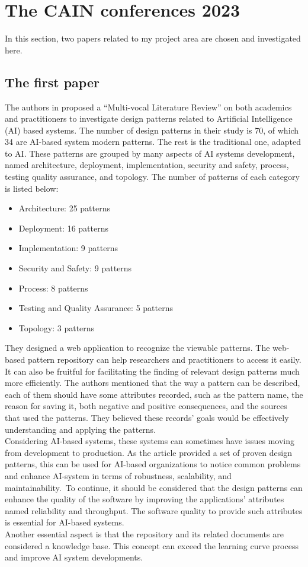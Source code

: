 \documentclass{article}
\begin{document}
\section{The CAIN conferences 2023}
In this section, two papers related to my project area are chosen and investigated here. 
\subsection{The first paper}
The authors in \cite{heiland2023design} proposed a ``Multi-vocal Literature Review'' on both academics and practitioners to investigate design patterns related to Artificial Intelligence (AI) based systems. The number of design patterns in their study is 70, of which 34 are AI-based system modern patterns. The rest is the traditional one, adapted to AI. These patterns are grouped by many aspects of AI systems development, named architecture, deployment, implementation, security and safety, process, testing quality assurance, and topology. The number of patterns of each category is listed below:
    \begin{itemize}
        \item Architecture: 25 patterns
        \item Deployment: 16 patterns
        \item Implementation: 9 patterns
    \item Security and Safety: 9 patterns
     \item Process: 8 patterns
     \item Testing and Quality Assurance: 5 patterns
    \item Topology: 3 patterns
    \end{itemize}

They designed a web application to recognize the viewable patterns. The web-based pattern repository can help researchers and practitioners to access it easily. It can also be fruitful for facilitating the finding of relevant design patterns much more efficiently. The authors mentioned that the way a pattern can be described, each of them should have some attributes recorded, such as the pattern name, the reason for saving it, both negative and positive consequences, and the sources that used the patterns. They believed these records' goals would be effectively understanding and applying the patterns. \\ 
Considering AI-based systems, these systems can sometimes have issues moving from development to production. As the article provided a set of proven design patterns, this can be used for AI-based organizations to notice common problems and enhance AI-system in terms of robustness, scalability, and maintainability.\ To continue, it should be considered that the design patterns can enhance the quality of the software by improving the applications' attributes named reliability and throughput. The software quality to provide such attributes is essential for AI-based systems. \\ Another essential aspect is that the repository and its related documents are considered a knowledge base. This concept can exceed the learning curve process and improve AI system developments.
\end{document}

